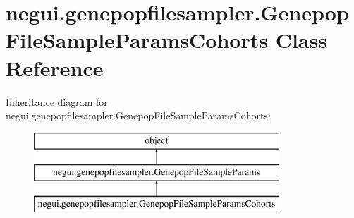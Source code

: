 \hypertarget{classnegui_1_1genepopfilesampler_1_1GenepopFileSampleParamsCohorts}{}\section{negui.\+genepopfilesampler.\+Genepop\+File\+Sample\+Params\+Cohorts Class Reference}
\label{classnegui_1_1genepopfilesampler_1_1GenepopFileSampleParamsCohorts}
Inheritance diagram for negui.\+genepopfilesampler.\+Genepop\+File\+Sample\+Params\+Cohorts\+:\begin{figure}[H]
\begin{center}
\leavevmode
\includegraphics[height=3.000000cm]{classnegui_1_1genepopfilesampler_1_1GenepopFileSampleParamsCohorts}
\end{center}
\end{figure}
